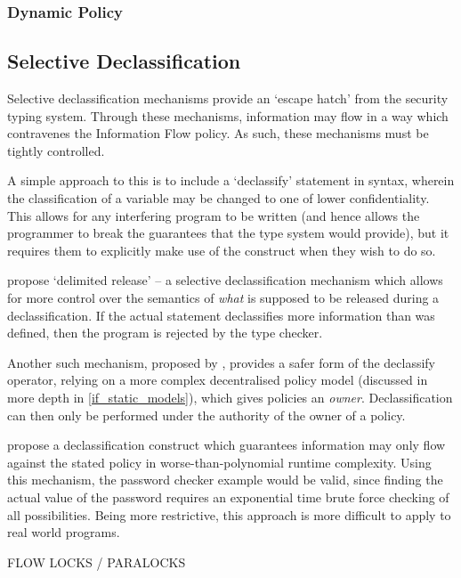 \subsubsection{Dynamic Policy}

\subsection{Selective Declassification}

Selective declassification mechanisms provide an `escape hatch' from the security typing system. Through these mechanisms, information may flow in a way which contravenes the Information Flow policy. As such, these mechanisms must be tightly controlled.

A simple approach to this is to include a `declassify' statement in syntax, wherein the classification of a variable may be changed to one of lower confidentiality. This allows for any interfering program to be written (and hence allows the programmer to break the guarantees that the type system would provide), but it requires them to explicitly make use of the construct when they wish to do so.

\citeauthor{sabelfeld2004model} \cite{sabelfeld2004model} propose `delimited release' -- a selective declassification mechanism which allows for more control over the semantics of \textit{what} is supposed to be released during a declassification. If the actual statement declassifies more information than was defined, then the program is rejected by the type checker.

Another such mechanism, proposed by \citeauthor{myers1997if} \cite{myers1997if}, provides a safer form of the declassify operator, relying on a more complex decentralised policy model (discussed in more depth in \ref{if_static_models}), which gives policies an \textit{owner}. Declassification can then only be performed under the authority of the owner of a policy.

\citeauthor{volpano2000declassification} \cite{volpano2000declassification} propose a declassification construct which guarantees information may only flow against the stated policy in worse-than-polynomial runtime complexity. Using this mechanism, the password checker example would be valid, since finding the actual value of the password requires an exponential time brute force checking of all possibilities. Being more restrictive, this approach is more difficult to apply to real world programs.

FLOW LOCKS / PARALOCKS

